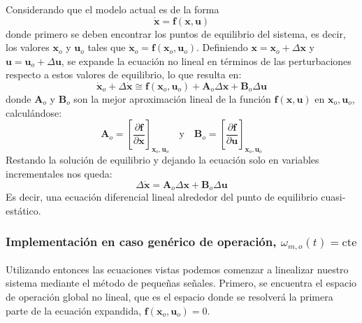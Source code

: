 \documentclass[12pt, a4paper,journal, onecolumn, compsoc]{IEEEtran}
\begin{document}
Considerando que el modelo actual es de la forma \[\bm{\dot x} =\bm{f}(\bm{x},\bm{u})\]
donde primero se deben encontrar los puntos de equilibrio del sistema, es decir, los valores \(\bm{x}_o\) y \(\bm{u}_o\) tales que \(\bm{\dot x}_o = \bm{f}(\bm{x}_o,\bm{u}_o)\). Definiendo \(\bm{x}=\bm{x}_o+\Delta\bm{x}\) y \(\bm{u}=\bm{u}_o+\Delta\bm{u}\), se expande la ecuación no lineal en términos de las perturbaciones respecto a estos valores de equilibrio, lo que resulta en:
\begin{equation*}
    \bm{\dot x}_o + \Delta\bm{\dot x} \cong \bm{f}(\bm{x}_o,\bm{u}_o) + \bm{A}_o\Delta\bm{x}+\bm{B}_o\Delta\bm{u}
\end{equation*}
donde \(\bm{A}_o\) y \(\bm{B}_o\) son la mejor aproximación lineal de la función \(\bm{f}(\bm{x},\bm{u})\) en \(\bm{x}_o,\bm{u}_o\), calculándose:
\begin{equation*}
    \bm{A}_o = \left[ \frac{\partial \bm{f}}{\partial \bm{x}} \right]_{\bm{x}_o,\bm{u}_o} \quad \text{y} \quad \bm{B}_o = \left[ \frac{\partial \bm{f}}{\partial \bm{u}} \right]_{\bm{x}_o,\bm{u}_o}
\end{equation*}
Restando la solución de equilibrio y dejando la ecuación solo en variables incrementales nos queda:
\begin{equation*}
    \Delta\bm{\dot x}=\bm{A}_o\Delta\bm{x}+\bm{B}_o\Delta\bm{u}
\end{equation*}
Es decir, una ecuación diferencial lineal alrededor del punto de equilibrio cuasi-estático.
\subsubsection{Implementación en caso genérico de operación, \(\omega_{m,o}(t)=\mathrm{cte}\)}
Utilizando entonces las ecuaciones vistas podemos comenzar a linealizar nuestro sistema mediante el método de pequeñas señales.
Primero, se encuentra el espacio de operación global no lineal, que es el espacio donde se resolverá la primera parte de la ecuación expandida, $\bm{f}(\bm{x}_o,\bm{u}_o)=0$.
\end{document}
